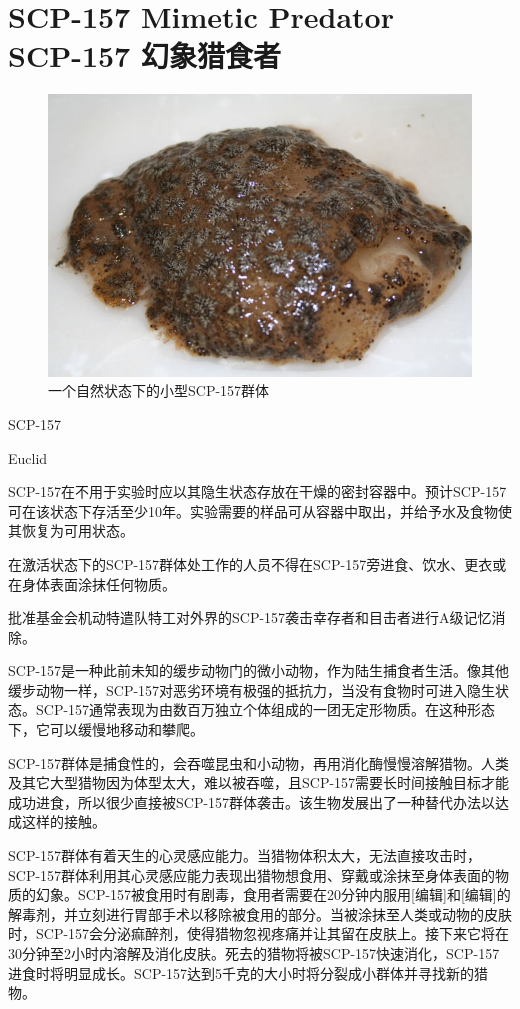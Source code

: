 \chapter[SCP-157 幻象猎食者]{
    SCP-157 Mimetic Predator\\
    SCP-157 幻象猎食者
}

\label{chap:SCP-157}

\begin{figure}[H]
    \centering
    \includegraphics[width=0.5\linewidth]{images/SCP-157.jpg}
    \caption*{一个自然状态下的小型SCP-157群体}
\end{figure}

SCP-157

Euclid

SCP-157在不用于实验时应以其隐生状态存放在干燥的密封容器中。预计SCP-157可在该状态下存活至少10年。实验需要的样品可从容器中取出，并给予水及食物使其恢复为可用状态。

在激活状态下的SCP-157群体处工作的人员不得在SCP-157旁进食、饮水、更衣或在身体表面涂抹任何物质。

批准基金会机动特遣队特工对外界的SCP-157袭击幸存者和目击者进行A级记忆消除。

SCP-157是一种此前未知的缓步动物门的微小动物，作为陆生捕食者生活。像其他缓步动物一样，SCP-157对恶劣环境有极强的抵抗力，当没有食物时可进入隐生状态。SCP-157通常表现为由数百万独立个体组成的一团无定形物质。在这种形态下，它可以缓慢地移动和攀爬。

SCP-157群体是捕食性的，会吞噬昆虫和小动物，再用消化酶慢慢溶解猎物。人类及其它大型猎物因为体型太大，难以被吞噬，且SCP-157需要长时间接触目标才能成功进食，所以很少直接被SCP-157群体袭击。该生物发展出了一种替代办法以达成这样的接触。

SCP-157群体有着天生的心灵感应能力。当猎物体积太大，无法直接攻击时，SCP-157群体利用其心灵感应能力表现出猎物想食用、穿戴或涂抹至身体表面的物质的幻象。SCP-157被食用时有剧毒，食用者需要在20分钟内服用{[}编辑]和{[}编辑]的解毒剂，并立刻进行胃部手术以移除被食用的部分。当被涂抹至人类或动物的皮肤时，SCP-157会分泌痲醉剂，使得猎物忽视疼痛并让其留在皮肤上。接下来它将在30分钟至2小时内溶解及消化皮肤。死去的猎物将被SCP-157快速消化，SCP-157进食时将明显成长。SCP-157达到5千克的大小时将分裂成小群体并寻找新的猎物。

